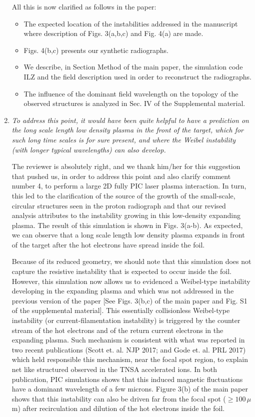 \documentclass[aps,showpacs,superscriptaddress]{revtex4}%
\begin{document}
\begin{enumerate}
All this is now clarified as follows in the paper:
\begin{itemize}
    \item The expected location of the instabilities addressed in the manuscript where description of  Figs. 3(a,b,c) and Fig. 4(a) are made.
    \item Figs. 4(b,c) presents our synthetic radiographs.
    \item We describe,  in Section Method of the main paper,  the simulation code ILZ and the field description used in order to reconstruct the radiographs.
    \item The influence of the dominant field wavelength on the topology of the observed structures is analyzed in Sec. IV of the Supplemental material. 
\end{itemize}

\item \textit{To address this point, it would have been quite helpful to have a prediction on the long scale length low density plasma in the front of the target, which for such long time scales is for sure present, and where the Weibel instability (with longer typical wavelengths) can also develop. }

The reviewer is absolutely right, and we thank him/her for this suggestion that pushed us, in order to address this point and also clarify comment number 4, to perform a large 2D fully  PIC laser plasma interaction. In turn, this led to the clarification of the source of the growth of the small-scale, circular structures seen in the proton radiograph and that our revised analysis attributes to the instability growing in this low-density expanding plasma.
The result of this simulation is shown in Figs. 3(a-b). As expected, we can observe that a long scale length low density plasma expands in front of the target after the hot electrons have spread inside the foil.

Because of its reduced geometry, we should note that this simulation does not capture the resistive instability that is expected to occur inside the foil. However, this simulation now allows us to evidenced a Weibel-type instability developing in the expanding plasma and which  was not addressed in the previous version of the paper [See Figs. 3(b,c) of the main paper and Fig. S1 of the supplemental material].
This essentially collisionless Weibel-type instability (or current-filamentation instability) is triggered by the counter stream of the hot electrons and of the  return current electrons in the expanding plasma. 
Such mechanism is consistent with what was reported in two recent publications (Scott et. al. NJP 2017; and Gode et. al. PRL 2017) which  held responsible this mechanism, near the focal spot region, to explain net like structured observed in the TNSA accelerated ions. In both publication, PIC simulations shows that this induced magnetic fluctuations  have a dominant wavelength of a few microns.
Figure 3(b) of the main paper shows that this instability can also be driven far from the focal spot ($\ge 100\, \mu$m) after recirculation and dilution  of the hot electrons  inside the foil.


\end{enumerate}
\end{document}
